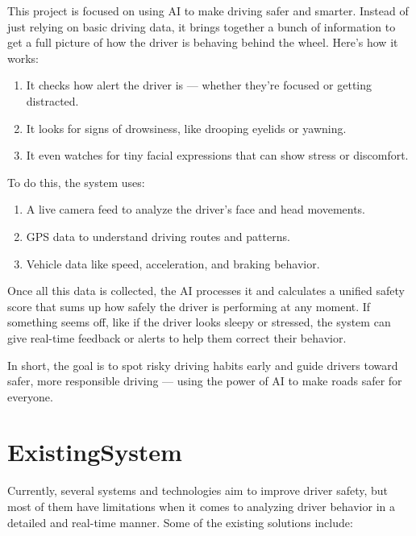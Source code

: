 \documentclass[
  letterpaper,
  DIV=11,
  numbers=noendperiod]{scrreport}
\begin{document}
This project is focused on using AI to make driving safer and smarter.
Instead of just relying on basic driving data, it brings together a
bunch of information to get a full picture of how the driver is behaving
behind the wheel. Here's how it works:

\begin{enumerate}
\def\labelenumi{\arabic{enumi}.}
\item
  It checks how alert the driver is --- whether they're focused or
  getting distracted.
\item
  It looks for signs of drowsiness, like drooping eyelids or yawning.
\item
  It even watches for tiny facial expressions that can show stress or
  discomfort.
\end{enumerate}

To do this, the system uses:

\begin{enumerate}
\def\labelenumi{\arabic{enumi}.}
\item
  A live camera feed to analyze the driver's face and head movements.
\item
  GPS data to understand driving routes and patterns.
\item
  Vehicle data like speed, acceleration, and braking behavior.
\end{enumerate}

Once all this data is collected, the AI processes it and calculates a
unified safety score that sums up how safely the driver is performing at
any moment. If something seems off, like if the driver looks sleepy or
stressed, the system can give real-time feedback or alerts to help them
correct their behavior.

In short, the goal is to spot risky driving habits early and guide
drivers toward safer, more responsible driving --- using the power of AI
to make roads safer for everyone.

\section{ExistingSystem}\label{existingsystem}

Currently, several systems and technologies aim to improve driver
safety, but most of them have limitations when it comes to analyzing
driver behavior in a detailed and real-time manner. Some of the existing
solutions include:
\end{document}
